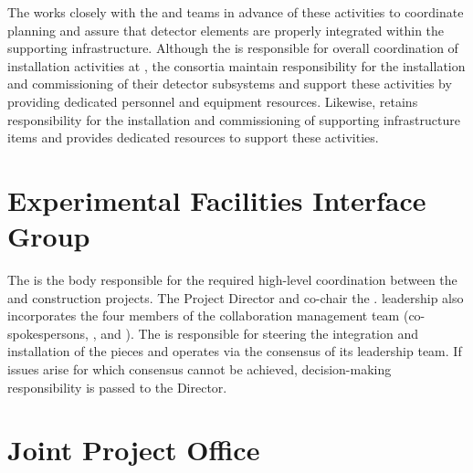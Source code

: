 The  works closely with the  and 
teams in advance of these activities to coordinate planning
and assure that detector elements are properly integrated within the 
supporting infrastructure.  Although the  is responsible 
for overall coordination of  installation activities
at , the  consortia maintain responsibility 
for the installation and commissioning of their detector subsystems
and support these activities by providing dedicated personnel and
equipment resources.  Likewise,  retains responsibility
for the installation and commissioning of supporting infrastructure
items and provides dedicated resources to support these activities.          

\section{Experimental Facilities Interface Group}
\label{sec:efig}

The  is the body responsible for the required high-level
coordination between the  and  construction 
projects.  The  Project Director and  
co-chair the .   leadership also incorporates 
the four members of the  collaboration management 
team (co-spokespersons, , and ).  
The  is responsible for steering the integration and   
installation of the  pieces and operates via the 
consensus of its leadership team.  If issues arise for which consensus 
cannot be achieved, decision-making responsibility is passed to the 
 Director.

\section{Joint Project Office}
\label{sec:jpo}

